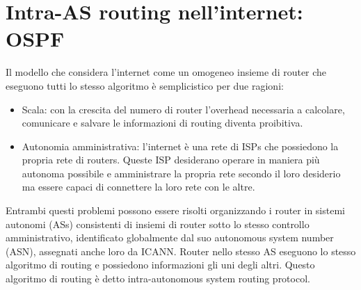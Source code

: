 \section{Intra-AS routing nell'internet: OSPF}
Il modello che considera l'internet come un omogeneo insieme di router che eseguono tutti lo stesso algoritmo \`e semplicistico per due ragioni:
\begin{itemize}
\item Scala: con la crescita del numero di router l'overhead necessaria a calcolare, comunicare e salvare le informazioni di routing diventa proibitiva. 
\item Autonomia amministrativa: l'internet \`e una rete di ISPs che possiedono la propria rete di routers. Queste ISP desiderano operare in maniera pi\`u
autonoma possibile e amministrare la propria rete secondo il loro desiderio ma essere capaci di connettere la loro rete con le altre.
\end{itemize}
Entrambi questi problemi possono essere risolti organizzando i router in sistemi autonomi (ASs) consistenti di insiemi di router sotto lo stesso controllo
amministrativo, identificato globalmente dal suo autonomous system number (ASN), assegnati anche loro da ICANN. Router nello stesso AS eseguono lo stesso 
algoritmo di routing e possiedono informazioni gli uni degli altri. Questo algoritmo di routing \`e detto intra-autonomous system routing protocol. 
